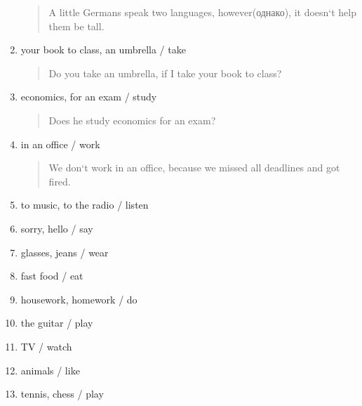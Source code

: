 \begin{enumerate}
\begin{quote}
		A little Germans speak two languages, however(однако), it doesn`t help them be tall.
	\end{quote}
	\item your book to class, an umbrella / take
	\begin{quote} 
		Do you take an umbrella, if I take your book to class?
	\end{quote}
	\item economics, for an exam / study
	\begin{quote} 
		Does he study economics for an exam?
	\end{quote}
	\item in an office / work
	\begin{quote} 
		We don`t work in an office, because we missed all deadlines and got fired.
	\end{quote}
	\item to music, to the radio / listen
	\item sorry, hello / say
	\item glasses, jeans / wear
	\item fast food / eat
	\item housework, homework / do
	\item the guitar / play
	\item TV / watch
	\item animals / like
	\item tennis, chess / play
\end{enumerate}
 